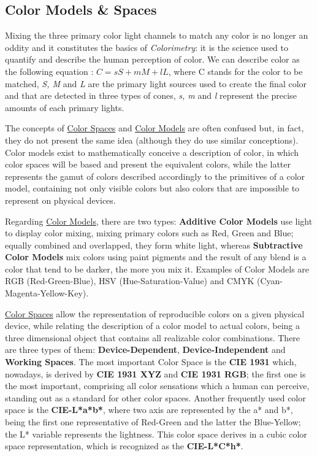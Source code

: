 \subsection{Color Models \& Spaces}
%
Mixing the three primary color light channels to match any color is no longer an oddity and it constitutes
the basics of \emph{Colorimetry}: it is the science used to quantify and describe the human perception of color.
We can describe color as the following equation \cite{Ware2012}: \textbf{$C = sS + mM + lL$}, where C stands for the color
to be matched, \emph{S, M} and \emph{L} are the primary light sources used to create the final color and that are
detected in three types of cones, \emph{s, m} and \emph{l} represent the precise amounts of each primary lights. \par
%
The concepts of \ul{Color Spaces} and \ul{Color Models}
are often confused but, in fact, they do not present the same idea (although they do use similar conceptions). Color models
exist to mathematically conceive a description of color, in which color spaces will be based and present the equivalent
colors, while the latter represents the gamut of colors described accordingly to the primitives of a color model,
containing not only visible colors but also colors that are impossible to represent on physical devices. \par
%
Regarding \ul{Color Models}, there are two types: \textbf{Additive Color Models} use light to display color mixing, mixing
primary colors such as Red, Green and Blue; equally combined and overlapped, they form white light, whereas
\textbf{Subtractive Color Models} mix colors using paint pigments and the result of any blend is a color that tend to be
darker, the more you mix it. Examples of Color Models are RGB (Red-Green-Blue), HSV (Hue-Saturation-Value) and CMYK
(Cyan-Magenta-Yellow-Key). \par
%
\ul{Color Spaces} allow the representation of reproducible colors on a given physical device, while relating the
description of a color model to actual colors, being a three dimensional object that contains all realizable color combinations.
There are three types of them: \textbf{Device-Dependent}, \textbf{Device-Independent} and \textbf{Working Spaces}. The
most important Color Space is the \textbf{CIE 1931} which, nowadays, is derived by \textbf{CIE 1931 XYZ} and \textbf{CIE 1931
RGB}; the first one is the most important, comprising all color sensations which a human can perceive, standing out as a
standard for other color spaces. Another frequently used color space is the \textbf{CIE-L*a*b*}, where two axis are represented
by the a* and b*, being the first one representative of Red-Green and the latter the Blue-Yellow; the L* variable represents the
lightness. This color space derives in a cubic color space representation, which is recognized as the \textbf{CIE-L*C*h*}.
%
